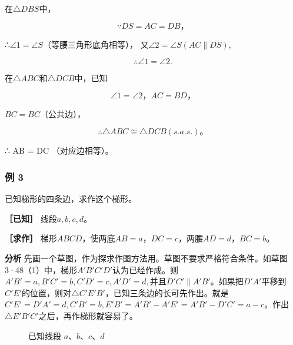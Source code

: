在\(\triangle DBS\)中，

\[
\because DS = AC = DB\text{，}
\]

∴\(\angle1=\angle S\)（等腰三角形底角相等），
又\(\angle 2 = \angle S(AC \parallel DS),\)

\[
\therefore \angle 1 = \angle 2.
\]

在\(\triangle ABC\)和\(\triangle DCB\)中，已知

\[
\angle 1 = \angle 2\text{，} AC = BD\text{，}
\]

\(BC = BC\)（公共边），

\[
\therefore \triangle ABC \cong \triangle DCB (s. a. s.)\text{。}
\]

∴ AB = DC （对应边相等）。

\subsubsection{例 3}

已知梯形的四条边，求作这个梯形。

\textbf{［已知］} 线段\(a, b, c, d\)。

\textbf{［求作］}
梯形\(ABCD\)，使两底\(AB = a\)，\(DC = c\)，两腰\(AD = d\)，\(BC = b\)。

\textbf{分析}
先画一个草图，作为探求作图方法用。草图不要求严格符合条件。如草图
3·48（1）中，梯形\(A'B'C'D'\)认为已经作成。则\(A'B' = a, B'C' = b, C'D' = c, A'D' = d,\)并且\(D'C' \parallel A'B'\)。如果把\(D'A'\)平移到\(C'E'\)的位置，则对\(\triangle C'E'B'\)，已知三条边的长可先作出。就是\(C'E' = D'A' = d, C'B' = b, E'B' = A'B' - A'E' = A'B' - D'C' = a - c\)。作出\(\triangle E'B'C'\)之后，再作梯形就容易了。

\begin{figure}
\centering
{}

\caption{已知线段 \(a\)、\(b\)、\(c\)、\(d\)}
\end{figure}

